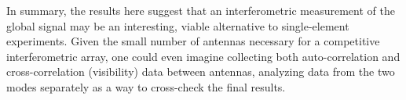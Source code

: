 \documentclass[twocolumn,apj,numberedappendix]{emulateapj}
\newcommand{\xhat}{\hat{\mathbf{x}}}
\newcommand{\y}{\mathbf{y}}
\newcommand{\Nfg}{\mathbf{N}_{\textrm{fg}}}
\newcommand{\mep}[1]{{\color{applegreen} \textbf{[MEP:  #1]}}}
\begin{document}
In summary, the results here suggest that an interferometric measurement of the global signal may be an interesting, viable alternative to single-element experiments. Given the small number of antennas necessary for a competitive interferometric array, one could even imagine collecting both auto-correlation and cross-correlation (visibility) data between antennas, analyzing data from the two modes separately as a way to cross-check the final results.


%
%
%
%
%
\end{document}
